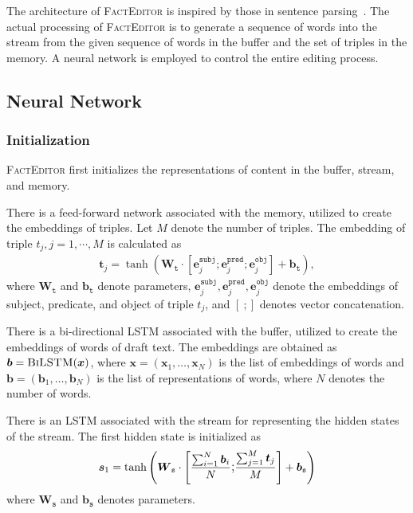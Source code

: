 \documentclass[11pt,a4paper]{article}
\begin{document}
The architecture of \textsc{FactEditor} is inspired by those in sentence parsing~\citet{dyer2015transition,watanabe-sumita-2015-transition}. The actual processing of \textsc{FactEditor} is to generate a sequence of words into the stream from the given sequence of words in the buffer and the set of triples in the memory.  A neural network is employed to control the entire editing process.

\subsection{Neural Network}
\label{sec:components}
\subsubsection*{Initialization}

\textsc{FactEditor} first initializes the representations of content in the buffer, stream, and memory.

There is a feed-forward network associated with the memory, utilized to create the embeddings of triples. Let $M$ denote the number of triples. The embedding of triple $t_j, j=1,\cdots,M$ is calculated as 
\begin{align*}
    \boldsymbol{t}_j = \tanh (\boldsymbol{W}_{\texttt{t}} \cdot [\boldsymbol{e}_j^{\texttt{subj}}; \boldsymbol{e}_j^{\texttt{pred}} ; \boldsymbol{e}_j^{\texttt{obj}}] + \boldsymbol{b}_{\texttt{t}}),
\end{align*}
where $\boldsymbol{W}_{\texttt{t}}$ and $\boldsymbol{b}_{\texttt{t}}$ denote parameters, $\boldsymbol{e}_j^{\texttt{subj}}, \boldsymbol{e}_j^{\texttt{pred}}, \boldsymbol{e}_j^{\texttt{obj}}$ denote the embeddings of subject, predicate, and object of triple $t_j$, and $[\ ;]$ denotes vector concatenation.

There is a bi-directional \textsc{LSTM} associated with the buffer, utilized to create the embeddings of words of draft text. The embeddings are obtained as $\boldsymbol{b} = \textsc{BiLSTM}(\boldsymbol{x})$,
where $\boldsymbol{x} = (\boldsymbol{x}_1, \dots, \boldsymbol{x}_{N}) $ is the list of embeddings of words and $\boldsymbol{b} = (\boldsymbol{b}_1, \dots, \boldsymbol{b}_{N})$ is the list of representations of words, where $N$ denotes the number of words.

There is an LSTM associated with the stream for representing the hidden states of the stream. The first 
hidden state is initialized as
\begin{align*}
    \boldsymbol{s}_1 = \tanh\left(\boldsymbol{W}_{\texttt{s}} \cdot \left[\frac{\sum_{i=1}^{N}
    \boldsymbol{b}_i}{N} \mathlarger{;} \frac{\sum_{j = 1}^{M} \boldsymbol{t}_j}{M} \right] + \boldsymbol{b}_{\texttt{s}}\right)
\end{align*}
where $\boldsymbol{W}_{\texttt{s}}$ and $\boldsymbol{b}_{\texttt{s}}$ denotes parameters.
\end{document}
